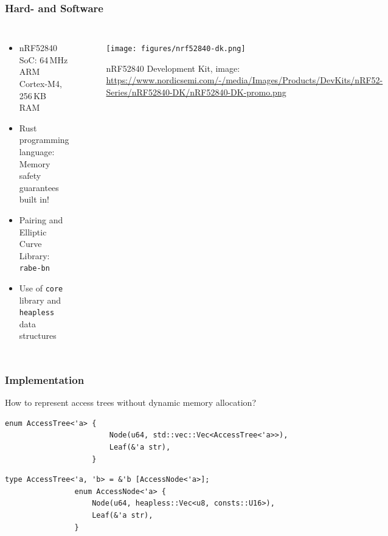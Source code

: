 \begin{frame}[c]
    \frametitle{Hard- and Software}
    \begin{columns}[c]
        \begin{itemize}
            \item nRF52840 SoC: \textcolor{TUMBlau}{64\,MHz} ARM Cortex-M4, \textcolor{TUMBlau}{256\,KB RAM}
            \item Rust programming language: Memory safety guarantees built in!
            \item Pairing and Elliptic Curve Library: \texttt{rabe-bn}\footnotemark
            \item Use of \texttt{core} library and \texttt{heapless} data structures\footnotemark
        \end{itemize}
        
        \begin{figure}
            \texttt{[image: figures/nrf52840-dk.png]}
            \caption{nRF52840 Development Kit, image: \url{https://www.nordicsemi.com/-/media/Images/Products/DevKits/nRF52-Series/nRF52840-DK/nRF52840-DK-promo.png}}
        \end{figure}
    \end{columns}
\end{frame}

\begin{frame}[c, fragile]
    \frametitle{Implementation}
    \begin{block}{How to represent access trees without dynamic memory allocation?}
        \begin{center}
            \begin{minipage}{0.7\textwidth}
                \begin{lstlisting}[caption={Naive implementation (uses standard library)}]
                    enum AccessTree<'a> {
                        Node(u64, std::vec::Vec<AccessTree<'a>>),
                        Leaf(&'a str),
                    }
                \end{lstlisting}
            \begin{lstlisting}[caption={Refined implementation}]
                type AccessTree<'a, 'b> = &'b [AccessNode<'a>];
                enum AccessNode<'a> {
                    Node(u64, heapless::Vec<u8, consts::U16>),
                    Leaf(&'a str),
                }
                \end{lstlisting}
            \end{minipage}
        \end{center}
    \end{block}
\end{frame}

